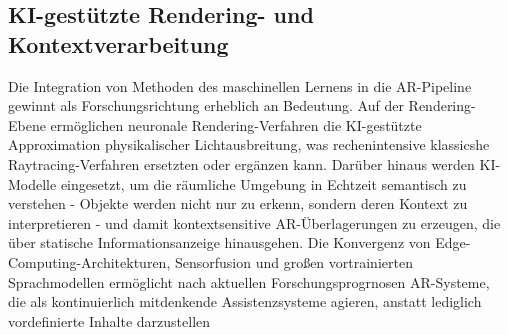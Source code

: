\subsection{KI-gestützte Rendering- und Kontextverarbeitung}
\label{subsec:KIgestuetztRenderingundKontextverarb}
Die Integration von Methoden des maschinellen Lernens in die \ac{AR}-Pipeline gewinnt als Forschungsrichtung erheblich an Bedeutung. Auf der Rendering-Ebene ermöglichen neuronale Rendering-Verfahren die \ac{KI}-gestützte Approximation physikalischer Lichtausbreitung, was rechenintensive klassicshe Raytracing-Verfahren ersetzten oder ergänzen kann. Darüber hinaus werden \ac{KI}-Modelle eingesetzt, um die räumliche Umgebung in Echtzeit semantisch zu verstehen - Objekte werden nicht nur zu erkenn, sondern deren Kontext zu interpretieren - und damit kontextsensitive \ac{AR}-Überlagerungen zu erzeugen, die über statische Informationsanzeige hinausgehen. Die Konvergenz von Edge-Computing-Architekturen, Sensorfusion und großen vortrainierten Sprachmodellen ermöglicht nach aktuellen Forschungsprogrnosen \ac{AR}-Systeme, die als kontinuierlich mitdenkende Assistenzsysteme agieren, anstatt lediglich vordefinierte Inhalte darzustellen